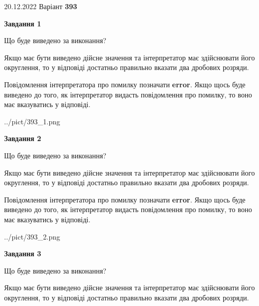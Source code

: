 \documentclass[12pt, ukrainian]{article}
\begin{document}
{20.12.2022 Варіант \No \textbf { 393 }\par}
{
\begin {Large}

{\begin {center}\textbf{Завдання 1}\end {center}}\par
Що буде виведено за виконання? \par

Якщо має бути виведено дійсне значення та інтерпретатор має здійснювати його округлення, 
то у відповіді достатньо правильно вказати два дробових розряди.

Повідомлення інтерпретатора про помилку позначати \textbf{error}.
Якщо щось буде виведено до того, як інтерпретатор видасть повідомлення про помилку, 
то воно має вказуватись у відповіді. \par

\begin{center}
	{../pict/393_1.png}
\end{center}
\newpage

{\begin {center}\textbf{Завдання 2}\end {center}}\par
Що буде виведено за виконання? \par

Якщо має бути виведено дійсне значення та інтерпретатор має здійснювати його округлення, 
то у відповіді достатньо правильно вказати два дробових розряди.

Повідомлення інтерпретатора про помилку позначати \textbf{error}.
Якщо щось буде виведено до того, як інтерпретатор видасть повідомлення про помилку, 
то воно має вказуватись у відповіді. \par

\begin{center}
	{../pict/393_2.png}
\end{center}
\newpage

{\begin {center}\textbf{Завдання 3}\end {center}}\par
Що буде виведено за виконання? \par

Якщо має бути виведено дійсне значення та інтерпретатор має здійснювати його округлення, 
то у відповіді достатньо правильно вказати два дробових розряди.


\end{Large}}
\end{document}

